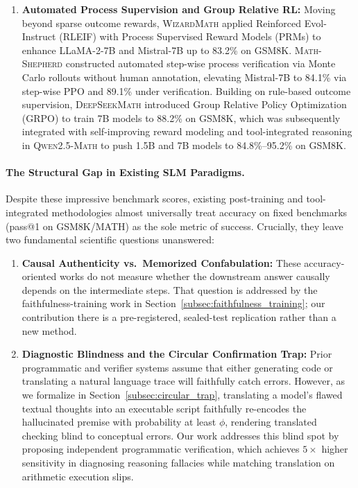 \documentclass[11pt,a4paper]{article}
\begin{document}
\begin{enumerate}
    \item \textbf{Automated Process Supervision and Group Relative RL:} Moving beyond sparse outcome rewards, \textsc{WizardMath} \citep{luo2023wizardmath} applied Reinforced Evol-Instruct (RLEIF) with Process Supervised Reward Models (PRMs) to enhance LLaMA-2-7B and Mistral-7B up to 83.2\% on GSM8K. \textsc{Math-Shepherd} \citep{wang2023mathshepherd} constructed automated step-wise process verification via Monte Carlo rollouts without human annotation, elevating Mistral-7B to 84.1\% via step-wise PPO and 89.1\% under verification. Building on rule-based outcome supervision, \textsc{DeepSeekMath} \citep{shao2024deepseekmath} introduced Group Relative Policy Optimization (GRPO) to train 7B models to 88.2\% on GSM8K, which was subsequently integrated with self-improving reward modeling and tool-integrated reasoning in \textsc{Qwen2.5-Math} \citep{yang2024qwen25math} to push 1.5B and 7B models to 84.8\%--95.2\% on GSM8K.
\end{enumerate}

\paragraph{The Structural Gap in Existing SLM Paradigms.}
Despite these impressive benchmark scores, existing post-training and tool-integrated methodologies almost universally treat accuracy on fixed benchmarks (pass@1 on GSM8K/MATH) as the sole metric of success. Crucially, they leave two fundamental scientific questions unanswered:
\begin{enumerate}
    \item \textbf{Causal Authenticity vs.\ Memorized Confabulation:} These accuracy-oriented works do not measure whether the downstream answer causally depends on the intermediate steps. That question is addressed by the faithfulness-training work in Section~\ref{subsec:faithfulness_training}; our contribution there is a pre-registered, sealed-test replication rather than a new method.
    \item \textbf{Diagnostic Blindness and the Circular Confirmation Trap:} Prior programmatic and verifier systems assume that either generating code or translating a natural language trace will faithfully catch errors. However, as we formalize in Section~\ref{subsec:circular_trap}, translating a model's flawed textual thoughts into an executable script faithfully re-encodes the hallucinated premise with probability at least $\phi$, rendering translated checking blind to conceptual errors. Our work addresses this blind spot by proposing independent programmatic verification, which achieves $5\times$ higher sensitivity in diagnosing reasoning fallacies while matching translation on arithmetic execution slips.
\end{enumerate}
\end{document}
